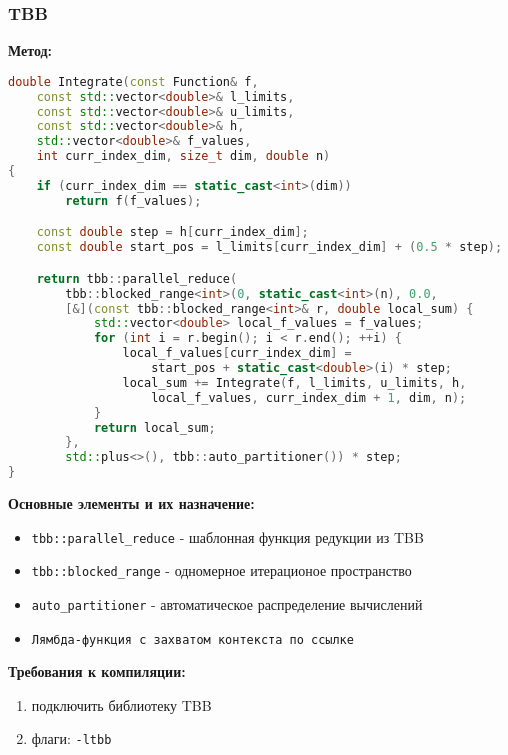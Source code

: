\documentclass[14pt,a4paper]{article}
\begin{document}
\subsubsection{TBB}
\textbf{Метод:}

\begin{framed}
\begin{lstlisting}[language=C++]
double Integrate(const Function& f, 
    const std::vector<double>& l_limits,
    const std::vector<double>& u_limits,
    const std::vector<double>& h,
    std::vector<double>& f_values,
    int curr_index_dim, size_t dim, double n) 
{
    if (curr_index_dim == static_cast<int>(dim))
        return f(f_values);

    const double step = h[curr_index_dim];
    const double start_pos = l_limits[curr_index_dim] + (0.5 * step);

    return tbb::parallel_reduce(
        tbb::blocked_range<int>(0, static_cast<int>(n), 0.0,
        [&](const tbb::blocked_range<int>& r, double local_sum) {
            std::vector<double> local_f_values = f_values;
            for (int i = r.begin(); i < r.end(); ++i) {
                local_f_values[curr_index_dim] = 
                    start_pos + static_cast<double>(i) * step;
                local_sum += Integrate(f, l_limits, u_limits, h,
                    local_f_values, curr_index_dim + 1, dim, n);
            }
            return local_sum;
        },
        std::plus<>(), tbb::auto_partitioner()) * step;
}
\end{lstlisting}
\end{framed}


\textbf{Основные элементы и их назначение:}
\begin{itemize}
\item \texttt{tbb::parallel\_reduce} - шаблонная функция редукции из TBB
\item \texttt{tbb::blocked\_range} - одномерное итерационое пространство
\item \texttt{auto\_partitioner} - автоматическое распределение вычислений
\item \texttt{Лямбда-функция с захватом контекста по ссылке}
\end{itemize}

\textbf{Требования к компиляции:}
\begin{enumerate}
\item подключить библиотеку TBB
\item флаги: \texttt{-ltbb}
\end{enumerate}
\end{document}

